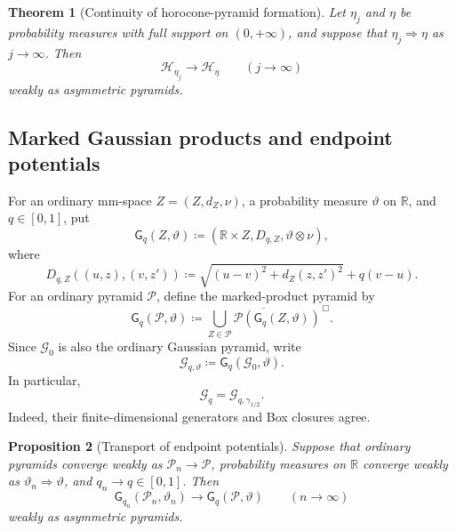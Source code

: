 \documentclass[10pt,a4paper]{amsart}
\numberwithin{equation}{section}
\newtheorem{theorem}{Theorem}[section]
\newtheorem{proposition}[theorem]{Proposition}
\newcommand{\R}{\mathbb R}
\newcommand{\Pyr}{\mathcal P}
\begin{document}
\begin{theorem}[Continuity of horocone-pyramid formation]\label{thm:height-law-pyramid-continuity}
Let $\eta_j$ and $\eta$ be probability measures with full support on $(0,+\infty)$, and suppose that
$\eta_j\Rightarrow\eta$ as $j\to\infty$.  Then
\begin{equation}\label{eq:height-law-pyramid-continuity}
 \mathcal H_{\eta_j}\longrightarrow\mathcal H_\eta\qquad(j\to\infty)
\end{equation}
weakly as asymmetric pyramids.
\end{theorem}

\subsection{Marked Gaussian products and endpoint potentials}

For an ordinary mm-space $Z=(Z,d_Z,\nu)$, a probability measure $\vartheta$ on $\R$, and $q\in[0,1]$, put
\begin{equation}\label{eq:marked-directed-space}
 \mathsf G_q(Z,\vartheta)\coloneqq(\R\times Z,D_{q,Z},\vartheta\otimes\nu),
\end{equation}
where
\begin{equation}\label{eq:Dq-general}
 D_{q,Z}((u,z),(v,z'))\coloneqq\sqrt{(u-v)^2+d_Z(z,z')^2}+q(v-u).
\end{equation}
For an ordinary pyramid $\mathcal P$, define the marked-product pyramid by
\begin{equation}\label{eq:marked-pyramid-operation}
 \mathsf G_q(\mathcal P,\vartheta)
 \coloneqq\overline{\bigcup_{Z\in\mathcal P}\Pyr(\mathsf G_q(Z,\vartheta))}^{\,\Box}.
\end{equation}
Since $\mathcal G_0$ is also the ordinary Gaussian pyramid, write
\begin{equation}\label{eq:G-q-mark-law}
 \mathcal G_{q,\vartheta}\coloneqq\mathsf G_q(\mathcal G_0,\vartheta).
\end{equation}
In particular,
\begin{equation}\label{eq:Gq-mark-specialization} \mathcal G_q=\mathcal G_{q,\gamma_{1/2}}. \end{equation}
Indeed, their finite-dimensional generators and Box closures agree.

\begin{proposition}[Transport of endpoint potentials]\label{prop:endpoint-potential-transport}
Suppose that ordinary pyramids converge weakly as $\mathcal P_n\to\mathcal P$, probability measures on $\R$ converge weakly
as $\vartheta_n\Rightarrow\vartheta$, and $q_n\to q\in[0,1]$.  Then
\begin{equation}\label{eq:directed-marked-product-limit}
 \mathsf G_{q_n}(\mathcal P_n,\vartheta_n)
 \longrightarrow\mathsf G_q(\mathcal P,\vartheta)\qquad(n\to\infty)
\end{equation}
weakly as asymmetric pyramids.
\end{proposition}
\end{document}
